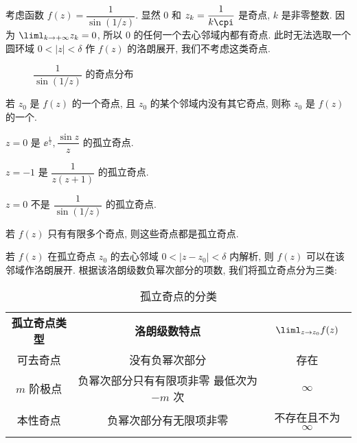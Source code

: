 \begin{example}
  考虑函数 $f(z)=\dfrac1{\sin(1/z)}$.
  显然 $0$ 和 $z_k=\dfrac1{k\cpi}$ 是奇点, $k$ 是非零整数.
  因为 $\liml_{k\ra+\infty} z_k=0$, 所以 $0$ 的任何一个去心邻域内都有奇点.
  此时无法选取一个圆环域 $0<|z|<\delta$ 作 $f(z)$ 的洛朗展开, 我们不考虑这类奇点.
\end{example}

\begin{figure}[!hbt]
  \centering
  \caption{$\dfrac1{\sin(1/z)}$ 的奇点分布}
\end{figure}

\begin{definition}
  若 $z_0$ 是 $f(z)$ 的一个奇点, 且 $z_0$ 的某个邻域内没有其它奇点, 则称 $z_0$ 是 $f(z)$ 的一个.
\end{definition}

\begin{exampleenum}
  \item $z=0$ 是 $\ee^{\frac1z},\dfrac{\sin z}z$ 的孤立奇点.
  \item $z=-1$ 是 $\dfrac1{z(z+1)}$ 的孤立奇点.
  \smallskip
  \item $z=0$ 不是 $\dfrac1{\sin(1/z)}$ 的孤立奇点.
\end{exampleenum}
\smallskip

若 $f(z)$ 只有有限多个奇点, 则这些奇点都是孤立奇点.

若 $f(z)$ 在孤立奇点 $z_0$ 的去心邻域 $0<|z-z_0|<\delta$ 内解析, 则 $f(z)$ 可以在该邻域作洛朗展开.
根据该洛朗级数负幂次部分的项数, 我们将孤立奇点分为三类:

\begin{table}[!htb]
  \centering
  \begin{tabular}{ccc}
    \topcolorrule
      \bf 孤立奇点类型&
      \bf 洛朗级数特点&
      $\liml_{z\ra z_0}f(z)$\\
    \topcolorrule
      可去奇点&
      没有负幂次部分&
      存在\\
    \midcolorrule
      $m$ 阶极点&
      \makecell{负幂次部分只有有限项非零\\最低次为 $-m$ 次}&
      $\infty$\\
    \midcolorrule
      本性奇点&
      负幂次部分有无限项非零&
      不存在且不为 $\infty$\\
    \bottomcolorrule
  \end{tabular}
  \caption{孤立奇点的分类}
\end{table}


